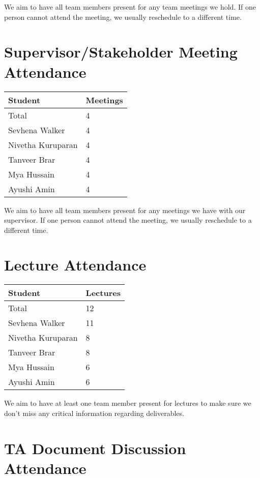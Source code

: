 \documentclass{article}
\begin{document}
We aim to have all team members present for any team meetings we hold. If one person cannot attend the meeting, we usually reschedule to a different time.

\section{Supervisor/Stakeholder Meeting Attendance}

\begin{table}[H]
\centering
\begin{tabular}{ll}
\toprule
\textbf{Student} & \textbf{Meetings}\\
\midrule
Total & 4\\
Sevhena Walker & 4\\
Nivetha Kuruparan & 4\\
Tanveer Brar & 4\\
Mya Hussain & 4\\
Ayushi Amin & 4\\
\bottomrule
\end{tabular}
\end{table}

We aim to have all team members present for any meetings we have with our supervisor. If one person cannot attend the meeting, we usually reschedule to a different time.

\section{Lecture Attendance}

\begin{table}[H]
\centering
\begin{tabular}{ll}
\toprule
\textbf{Student} & \textbf{Lectures}\\
\midrule
Total & 12\\
Sevhena Walker & 11\\
Nivetha Kuruparan & 8\\
Tanveer Brar & 8\\
Mya Hussain & 6\\
Ayushi Amin & 6\\
\bottomrule
\end{tabular}
\end{table}

We aim to have at least one team member present for lectures to make sure we don't miss any critical information regarding deliverables.

\section{TA Document Discussion Attendance}
\end{document}
